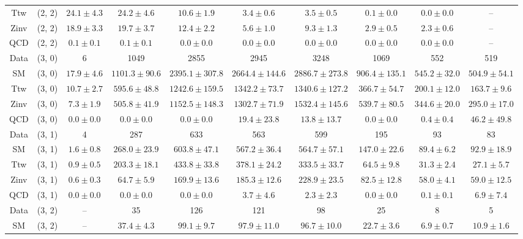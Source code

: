 \begin{table}[h!]
{\begin{tabular}{cccccccccc}
	Ttw & (2, 2) & $24.1\pm 4.3$ & $24.2\pm 4.6$ & $10.6\pm 1.9$ & $3.4\pm 0.6$ & $3.5\pm 0.5$ & $0.1\pm 0.0$ & $0.0\pm 0.0$ & -- \\[0.5ex] 
	Zinv & (2, 2) & $18.9\pm 3.3$ & $19.7\pm 3.7$ & $12.4\pm 2.2$ & $5.6\pm 1.0$ & $9.3\pm 1.3$ & $2.9\pm 0.5$ & $2.3\pm 0.6$ & -- \\[0.5ex] 
	QCD & (2, 2) & $0.1\pm 0.1$ & $0.1\pm 0.1$ & $0.0\pm 0.0$ & $0.0\pm 0.0$ & $0.0\pm 0.0$ & $0.0\pm 0.0$ & $0.0\pm 0.0$ & -- \\[0.5ex] 
	Data & (3, 0) & 6 & 1049 & 2855 & 2945 & 3248 & 1069 & 552 & 519 \\[0.5ex] 
	SM & (3, 0) & $17.9\pm 4.6$ & $1101.3\pm 90.6$ & $2395.1\pm 307.8$ & $2664.4\pm 144.6$ & $2886.7\pm 273.8$ & $906.4\pm 135.1$ & $545.2\pm 32.0$ & $504.9\pm 54.1$ \\[0.5ex] 
	Ttw & (3, 0) & $10.7\pm 2.7$ & $595.6\pm 48.8$ & $1242.6\pm 159.5$ & $1342.2\pm 73.7$ & $1340.6\pm 127.2$ & $366.7\pm 54.7$ & $200.1\pm 12.0$ & $163.7\pm 9.6$ \\[0.5ex] 
	Zinv & (3, 0) & $7.3\pm 1.9$ & $505.8\pm 41.9$ & $1152.5\pm 148.3$ & $1302.7\pm 71.9$ & $1532.4\pm 145.6$ & $539.7\pm 80.5$ & $344.6\pm 20.0$ & $295.0\pm 17.0$ \\[0.5ex] 
	QCD & (3, 0) & $0.0\pm 0.0$ & $0.0\pm 0.0$ & $0.0\pm 0.0$ & $19.4\pm 23.8$ & $13.8\pm 13.7$ & $0.0\pm 0.0$ & $0.4\pm 0.4$ & $46.2\pm 49.8$ \\[0.5ex] 
	Data & (3, 1) & 4 & 287 & 633 & 563 & 599 & 195 & 93 & 83 \\[0.5ex] 
	SM & (3, 1) & $1.6\pm 0.8$ & $268.0\pm 23.9$ & $603.8\pm 47.1$ & $567.2\pm 36.4$ & $564.7\pm 57.1$ & $147.0\pm 22.6$ & $89.4\pm 6.2$ & $92.9\pm 18.9$ \\[0.5ex] 
	Ttw & (3, 1) & $0.9\pm 0.5$ & $203.3\pm 18.1$ & $433.8\pm 33.8$ & $378.1\pm 24.2$ & $333.5\pm 33.7$ & $64.5\pm 9.8$ & $31.3\pm 2.4$ & $27.1\pm 5.7$ \\[0.5ex] 
	Zinv & (3, 1) & $0.6\pm 0.3$ & $64.7\pm 5.9$ & $169.9\pm 13.6$ & $185.3\pm 12.6$ & $228.9\pm 23.5$ & $82.5\pm 12.8$ & $58.0\pm 4.1$ & $59.0\pm 12.5$ \\[0.5ex] 
	QCD & (3, 1) & $0.0\pm 0.0$ & $0.0\pm 0.0$ & $0.0\pm 0.0$ & $3.7\pm 4.6$ & $2.3\pm 2.3$ & $0.0\pm 0.0$ & $0.1\pm 0.1$ & $6.9\pm 7.4$ \\[0.5ex] 
	Data & (3, 2) & -- & 35 & 126 & 121 & 98 & 25 & 8 & 5 \\[0.5ex] 
	SM & (3, 2) & -- & $37.4\pm 4.3$ & $99.1\pm 9.7$ & $97.9\pm 11.0$ & $96.7\pm 10.0$ & $22.7\pm 3.6$ & $6.9\pm 0.7$ & $10.9\pm 1.6$ \\[0.5ex] 

\end{tabular}}
\end{table}
